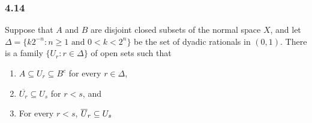 \documentclass[../../main.tex]{subfiles}
\begin{document}
\subsubsection*{4.14}
\begin{wts}
    Suppose that $A$ and $B$ are disjoint closed subsets of the normal space $X$, and let $\Delta = \{k2^{-n}: n\geq 1 \text{ and } 0<k<2^n\}$ be the set of dyadic rationals in $(0,1)$. There is a family $\{U_r:r\in\Delta\}$ of open sets such that
    \begin{enumerate}
        \item $A\subseteq U_r\subseteq B^c$ for every $r\in \Delta$,
        \item $\overline{U_r}\subseteq U_s$ for $r<s$, and
        \item For every $r<s$, $\overline{U}_r\subseteq U_s$
    \end{enumerate}
\end{wts}
\newcommand{\ksmall}{(k-1)/2^N}
\newcommand{\kbig}{(k+1)/2^N}
\newcommand{\jiggle}[1]{\mathcal{J}({#1})}
\end{document}

